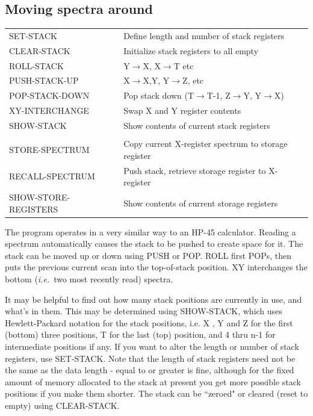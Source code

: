 \documentclass[11pt,twoside]{report}
\newcommand{\ie}{{\it i.e.\,}}
\begin{document}
\subsection{Moving spectra around}

\begin{tabular}{ll}
SET-STACK              & Define length and number of stack registers\\
CLEAR-STACK            & Initialize stack registers to all empty\\
ROLL-STACK             & Y$\rightarrow$X, X$\rightarrow$T etc\\
PUSH-STACK-UP          & X$\rightarrow$X,Y, Y$\rightarrow$Z, etc\\
POP-STACK-DOWN         & \parbox[t]{4.5in}{
                         Pop stack down (T$\rightarrow$T-1, Z$\rightarrow$Y,
                         Y$\rightarrow$X)}\\
XY-INTERCHANGE         & Swap X and Y register contents\\
SHOW-STACK             & Show contents of current stack registers\\
\\
STORE-SPECTRUM         & Copy current X-register spectrum to storage register\\
RECALL-SPECTRUM        & Push stack, retrieve storage register to X-register\\
SHOW-STORE-REGISTERS   & Show contents of current storage registers\\
\end{tabular}

The program operates in a very similar way to an HP-45
calculator. Reading a spectrum automatically causes
the stack to be pushed to create space for it. The stack can be
moved up or down using PUSH or POP. ROLL first POPs, then puts the previous
current scan into the top-of-stack position. XY interchanges the bottom (\ie
two most recently read) spectra.

It may be helpful to find out how many stack positions are currently in use,
and what's in them. This may be determined using SHOW-STACK, which uses
Hewlett-Packard notation for the stack positions, i.e. X
,
Y
and Z
for the first (bottom) three positions, T for the last
(top) position, and 4 thru n-1 for intermediate positions if any. If you want
to alter the length or number of stack registers, use SET-STACK. Note that the
length of stack registers need not be the same
as the data length - equal to or greater is fine, although for the fixed amount
of memory allocated to the stack at present you get more possible stack
positions if you make them shorter. The stack can be ``zeroed" or cleared
(reset to empty) using CLEAR-STACK.
\end{document}
